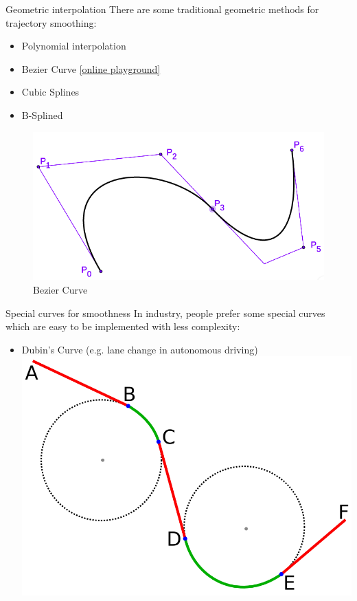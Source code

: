 \documentclass{beamer}
\begin{document}
\begin{frame}{Geometric interpolation}
	There are some traditional geometric methods for trajectory smoothing:
	\begin{itemize}
		\item Polynomial interpolation
		\item Bezier Curve \href{https://www.geogebra.org/m/r3UWE9KR}{[online playground]}
		\item Cubic Splines
		\item B-Splined
	\end{itemize}
	\begin{figure}
		\includegraphics[width=0.5\linewidth]{figures/bezier_curve.png}
		\caption{Bezier Curve}
	\end{figure}
\end{frame}

\begin{frame}{Special curves for smoothness}
	In industry, people prefer some special curves which are easy to be implemented with less complexity:
	\begin{itemize}
		\item Dubin’s Curve (e.g. lane change in autonomous driving)
		\includegraphics[width=0.5\linewidth]{figures/dubin-curve.png}
	\end{itemize}
\end{frame}
\end{document}
